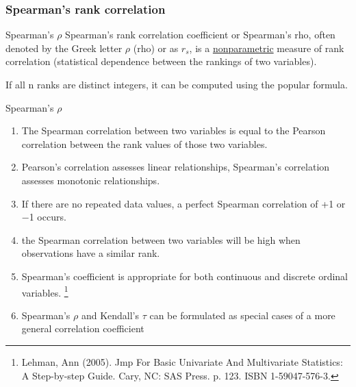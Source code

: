 \documentclass{beamer}
\begin{document}
\subsubsection{Spearman's rank correlation}

\begin{frame}{Spearman's $\rho$}
	\centering 
	Spearman's rank correlation coefficient or Spearman's rho, often denoted by the Greek letter $\rho$  (rho) or as $r_{s}$, is a \underline{nonparametric} measure of rank correlation (statistical dependence between the rankings of two variables). 



If all n ranks are distinct integers, it can be computed using the popular formula. 


\end{frame}

\begin{frame}{Spearman's $\rho$} \fontsize{8} \selectfont 
	
	\begin{enumerate}
		\item The Spearman correlation between two variables is equal to the Pearson correlation between the rank values of those two variables. 
		\item Pearson's correlation assesses linear relationships, Spearman's correlation assesses monotonic relationships.
		\item If there are no repeated data values, a perfect Spearman correlation of +1 or −1 occurs. 
		\item the Spearman correlation between two variables will be high when observations have a similar rank. 
		\item Spearman's coefficient is appropriate for both continuous and discrete ordinal variables. \footnote{Lehman, Ann (2005). Jmp For Basic Univariate And Multivariate Statistics: A Step-by-step Guide. Cary, NC: SAS Press. p. 123. ISBN 1-59047-576-3.}
		\item Spearman's $\rho$  and Kendall's $\tau$  can be formulated as special cases of a more general correlation coefficient
	\end{enumerate}
	
	
\end{frame}
\end{document}
